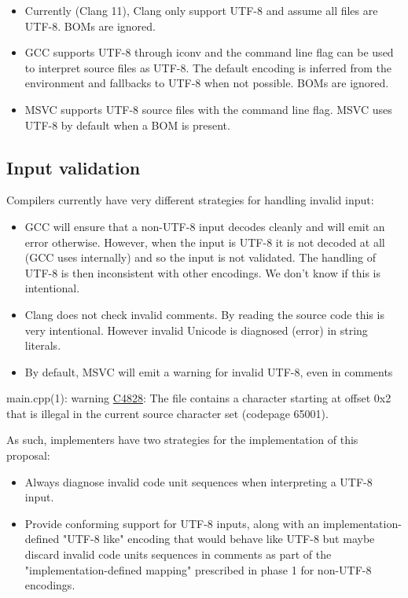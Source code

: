 \documentclass{wg21}
\begin{document}
\begin{itemize}
\item Currently (Clang 11), Clang only support UTF-8 and assume all files are UTF-8. BOMs are ignored.
\item GCC supports UTF-8 through iconv and the command line flag  can be used to interpret source files as UTF-8.
The default encoding is inferred from the environment and fallbacks to UTF-8 when not possible. BOMs are ignored.
\item MSVC supports UTF-8 source files with the  command line flag. MSVC uses UTF-8 by default when a BOM is present.
\end{itemize}


\subsection{Input validation}

Compilers currently have very different strategies for handling invalid input:

\begin{itemize}
\item GCC will ensure that a non-UTF-8 input decodes cleanly and will emit an error otherwise. However, when the input is UTF-8 it is
not decoded at all (GCC uses internally) and so the input is not validated. The handling of UTF-8 is then inconsistent with other encodings.
We don't know if this is intentional.
\item Clang does not check invalid comments. By reading the source code this is very intentional. However invalid Unicode is diagnosed (error) in string literals.
\item By default, MSVC will emit a warning for invalid UTF-8, even in comments
\end{itemize}

\begin{quoteblock}
main.cpp(1): warning \href{https://docs.microsoft.com/en-us/cpp/error-messages/compiler-warnings/compiler-warnings-by-compiler-version?view=msvc-160#warnings-introduced-in-visual-studio-2015-update-2-compiler-version-1900239180}{C4828}: The file contains a character starting at offset 0x2 that is illegal in the current source character set (codepage 65001).
\end{quoteblock}

As such, implementers have two strategies for the implementation of this proposal:

\begin{itemize}
\item Always diagnose invalid code unit sequences when interpreting a UTF-8 input.
\item Provide conforming support for UTF-8 inputs, along with an implementation-defined "UTF-8 like" encoding that would behave like UTF-8 but maybe discard
invalid code units sequences in comments as part of the "implementation-defined mapping" prescribed in phase 1 for non-UTF-8 encodings.
\end{itemize}
\end{document}

